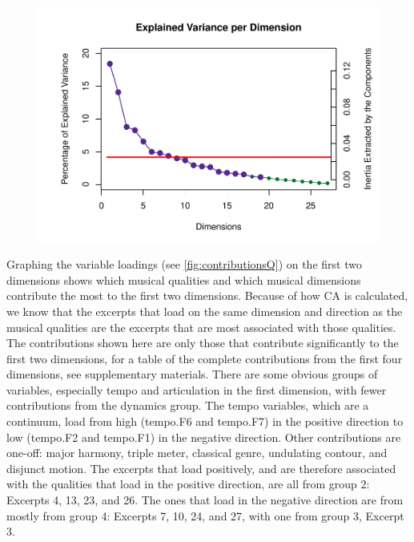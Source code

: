 \documentclass[
  english,
  man,floatsintext]{apa6}
\begin{document}
\begin{figure}

{\centering \includegraphics{Music-Descriptor-Space_files/figure-latex/scree4excerptsq-1} 

}

\caption{ }\label{fig:scree4excerptsq}
\end{figure}

Graphing the variable loadings (see \ref{fig:contributionsQ}) on the first two dimensions shows which musical qualities and which musical dimensions contribute the most to the first two dimensions. Because of how CA is calculated, we know that the excerpts that load on the same dimension and direction as the musical qualities are the excerpts that are most associated with those qualities. The contributions shown here are only those that contribute significantly to the first two dimensions, for a table of the complete contributions from the first four dimensions, see supplementary materials.
There are some obvious groups of variables, especially tempo and articulation in the first dimension, with fewer contributions from the dynamics group. The tempo variables, which are a continuum, load from high (tempo.F6 and tempo.F7) in the positive direction to low (tempo.F2 and tempo.F1) in the negative direction. Other contributions are one-off: major harmony, triple meter, classical genre, undulating contour, and disjunct motion. The excerpts that load positively, and are therefore associated with the qualities that load in the positive direction, are all from group 2: Excerpts 4, 13, 23, and 26. The ones that load in the negative direction are from mostly from group 4: Excerpts 7, 10, 24, and 27, with one from group 3, Excerpt 3.
\end{document}
